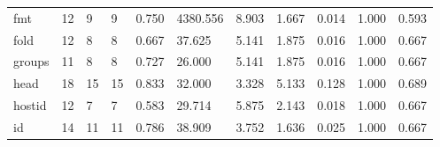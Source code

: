 \begin{longtable}{lp{1.2cm}p{1.2cm}p{1.2cm}p{1.2cm}p{1.2cm}p{1.2cm}p{1.2cm}p{1.2cm}p{1.2cm}p{1.2cm}}
fmt       &                           12 &                  9 &                                 9 &                                      0.750 &                               4380.556 &                                        8.903 &                             1.667 &                                   0.014 &                              1.000 &                                              0.593 \\
fold      &                           12 &                  8 &                                 8 &                                      0.667 &                                 37.625 &                                        5.141 &                             1.875 &                                   0.016 &                              1.000 &                                              0.667 \\
groups    &                           11 &                  8 &                                 8 &                                      0.727 &                                 26.000 &                                        5.141 &                             1.875 &                                   0.016 &                              1.000 &                                              0.667 \\
head      &                           18 &                 15 &                                15 &                                      0.833 &                                 32.000 &                                        3.328 &                             5.133 &                                   0.128 &                              1.000 &                                              0.689 \\
hostid    &                           12 &                  7 &                                 7 &                                      0.583 &                                 29.714 &                                        5.875 &                             2.143 &                                   0.018 &                              1.000 &                                              0.667 \\
id        &                           14 &                 11 &                                11 &                                      0.786 &                                 38.909 &                                        3.752 &                             1.636 &                                   0.025 &                              1.000 &                                              0.667 \\

\end{longtable}
